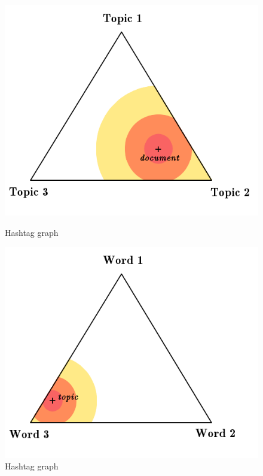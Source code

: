 \documentclass[a4paper,twoside,12pt,openright]{report}
\begin{document}
\begin{figure}[H]
\begin{minipage}[t]{0.48\textwidth}
\begin{center}
\includegraphics[width=\textwidth]{images/diags/lda_1.png}
\caption{Hashtag graph}
\label{diri_distri1}
\end{center}
\end{minipage}
\hfill
\begin{minipage}[t]{0.48\textwidth}
\begin{center}
\includegraphics[width=\textwidth]{images/diags/lda_2.png}
\caption{Hashtag graph}
\label{diri_distri2}
\end{center}
\end{minipage}
\end{figure}
\end{document}

